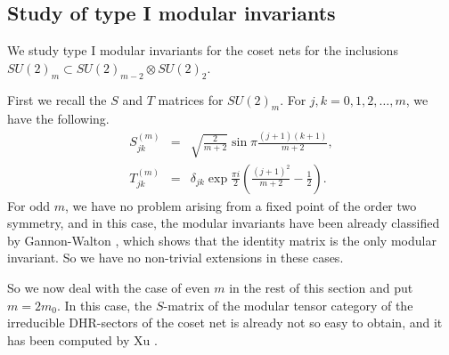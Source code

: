 \documentclass[11pt]{article}
\def\de{\delta}
\begin{document}
\subsection{Study of type I modular invariants} 
%
We study type I modular invariants for the coset
nets for the inclusions $SU(2)_m\subset SU(2)_{m-2}\otimes SU(2)_2$.

First we recall the $S$ and $T$ matrices for $SU(2)_m$.
For $j,k=0,1,2,\dots,m$, we have the following.
\begin{eqnarray*}
S^{(m)}_{jk}&=&\sqrt{\frac{2}{m+2}}\sin \pi\frac{(j+1)(k+1)}{m+2},\\
T^{(m)}_{jk}&=&\de_{jk}\exp\frac{\pi i}{2}
\left(\frac{(j+1)^2}{m+2}-\frac12\right).
\end{eqnarray*}
For odd $m$, we have no problem arising from a fixed point of
the order two symmetry, and in this case, the modular invariants
have been already classified by Gannon-Walton \cite{GW}, which
shows that the identity matrix is the only modular invariant.  So
we have no non-trivial extensions in these cases.

So we now deal with the case of even $m$ in the rest of this
section and put $m=2m_0$.  In this case, the
$S$-matrix of the modular tensor category of the irreducible
DHR-sectors of the coset net is already not so easy to
obtain, and it has been computed by Xu \cite{X3}.
\end{document}
